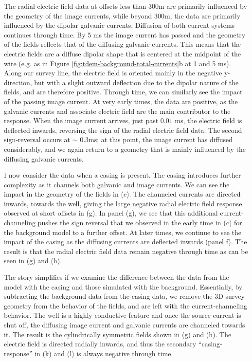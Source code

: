 The radial electric field data at offsets less than 300m are primarily influenced by the geometry of the image currents, while beyond 300m, the data are primarily influenced by the dipolar galvanic currents. Diffusion of both current systems continues through time. By 5 ms the image current has passed and the geometry of the fields reflects that of the diffusing galvanic currents. This means that the electric fields are a diffuse dipolar shape that is centered at the midpoint of the wire (e.g. as in Figure \ref{fig:tdem-background-total-currents}b at 1 and 5 ms). Along our survey line, the electric field is oriented mainly in the negative y-direction, but with a slight outward deflection due to the dipolar nature of the fields, and are therefore positive. Through time, we can similarly see the impact of the passing image current. At very early times, the data are positive, as the galvanic currents and associate electric field are the main contributor to the response. When the image current arrives, just past $0.01$ ms, the electric field is deflected inwards, reversing the sign of the radial electric field data. The second sign-reversal occurs at $\sim$ 0.3ms; at this point, the image current has diffused considerably, and we again return to a geometry that is mainly influenced by the diffusing galvanic currents.

I now consider the data when a casing is present. The casing introduces further complexity as it channels both galvanic and image currents. We can see the impact in the geometry of the fields in (e). The channeled currents are directed inwards, towards the well, giving the large negative radial electric field response observed at short offsets in (g). In panel (g), we see that this additional current-channeling pushes the sign reversal that we observed in the early time in (c) for the background model to a further offset. At later times, we continue to see the impact of the casing as the diffusing currents are deflected inwards (panel f). The result is that the radial electric field data remain negative through time as can be seen in (g) and (h).

The story simplifies if we examine the difference between the data from the model with the casing and those simulated with the background. Essentially, by subtracting the background data from the casing data, we remove the 3D survey geometry from the behavior of the fields, and are left with the current-channeling behavior. The well is a highly conductive feature and once the source current is shut off, the diffusing image current and galvanic currents are channeled towards it. The result is the cylindrically symmetric fields shown in (g) and (h). The electric field is directed radially inwards, and thus the secondary ``casing-response'' in (k) and (l) is always negative through time.


